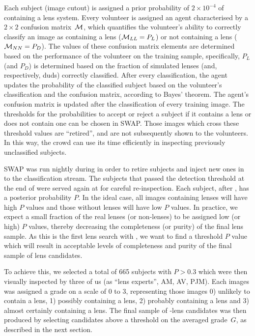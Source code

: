 \documentclass[useAMS,usenatbib,a4paper]{mn2e}
\begin{document}
Each subject (image cutout) is assigned a prior probability of
$2\times10^{-4}$ of containing a lens system. Every volunteer
is assigned an agent characterised by a $2\times2$ confusion matrix~$\mathcal{M}$,
which quantifies the volunteer's ability to correctly classify an image
as containing a lens ($\mathcal{M}_{LL} = P_L$) or not containing a lens ($\mathcal{M}_{NN} = P_D$).
The values of
these confusion matrix elements are determined based on the performance of the
volunteer on the training sample, specifically, $P_L$ (and $P_D$) is
determined based on the fraction of simulated lenses (and, respectively, duds)
correctly classified. After every classification, the agent updates the
probability of the classified subject based on the volunteer's classification
and the confusion matrix, according to Bayes' theorem.
The agent's confusion matrix is updated after the
classification of every training image. The thresholds for the
probabilities to accept or reject a subject if it contains a lens or does
not contain one can be chosen in SWAP. Those images which cross
these threshold values are ``retired'', and are not subsequently shown to the
volunteers. In this way, the crowd can use its time efficiently in
inspecting previously unclassified subjects.

SWAP was run nightly during \StageOne in order to retire subjects and inject new
ones in to the classification stream. The subjects that passed the detection
threshold at the end of \StageOne were served again at \StageTwo for careful
re-inspection. Each subject, after \StageTwo, has a posterior
probability $P$. In the ideal case, all images containing lenses will have high $P$
values and those without lenses will have low $P$ values. In practice, we expect a
small fraction of the real lenses (or non-lenses) to be assigned low (or high) $P$
values, thereby decreasing the completeness (or purity) of the final lens
sample. As this is the first lens search with \sw, we want to find a
threshold $P$ value which will result in acceptable levels of completeness and
purity of the final sample of lens candidates.

To achieve this, we selected a total of 665 subjects with $P>0.3$
which were then visually inspected by three of us (as ``lens experts'',
 AM, AV, PJM).  Each images was assigned a grade on a scale of 0 to 3,
representing those images
0) unlikely to contain a lens, 1) possibly containing a lens, 2) probably
containing a lens and 3) almost certainly containing a
lens. The final sample of \sw-\cfhtls lens candidates was
then produced by selecting candidates above a threshold on the
averaged grade~$G$, as described in the next section.
\end{document}
